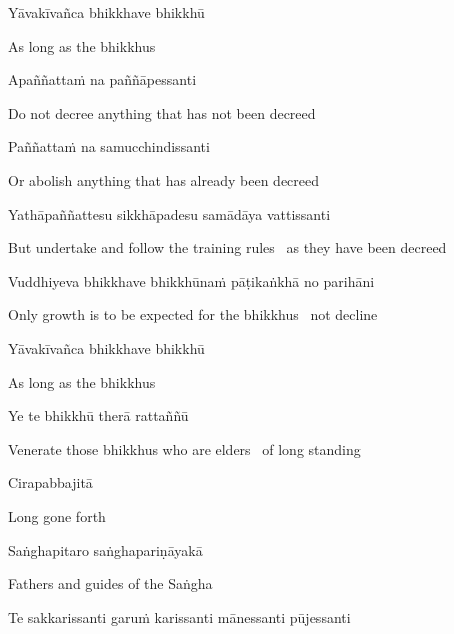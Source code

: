 Yāvakīvañca bhikkhave bhikkhū

\begin{cprenglish}
  As long as the bhikkhus
\end{cprenglish}

Apaññattaṁ na paññāpessanti

\begin{cprenglish}
  Do not decree anything that has not been decreed
\end{cprenglish}

Paññattaṁ na samucchindissanti

\begin{cprenglish}
  Or abolish anything that has already been decreed
\end{cprenglish}

Yathāpaññattesu sikkhāpadesu samādāya vattissanti

\begin{cprenglish}
  But undertake and follow the training rules \breathmark\ as they have been decreed
\end{cprenglish}

Vuddhiyeva bhikkhave bhikkhūnaṁ pāṭikaṅkhā no parihāni

\begin{cprenglish}
  Only growth is to be expected for the bhikkhus \breathmark\ not decline
\end{cprenglish}

Yāvakīvañca bhikkhave bhikkhū

\begin{cprenglish}
  As long as the bhikkhus
\end{cprenglish}

Ye te bhikkhū therā rattaññū

\begin{cprenglish}
  Venerate those bhikkhus who are elders \breathmark\ of long standing
\end{cprenglish}

Cirapabbajitā

\begin{cprenglish}
  Long gone forth
\end{cprenglish}

Saṅghapitaro saṅghapariṇāyakā

\begin{cprenglish}
  Fathers and guides of the Saṅgha
\end{cprenglish}

Te sakkarissanti garuṁ karissanti mānessanti pūjessanti

